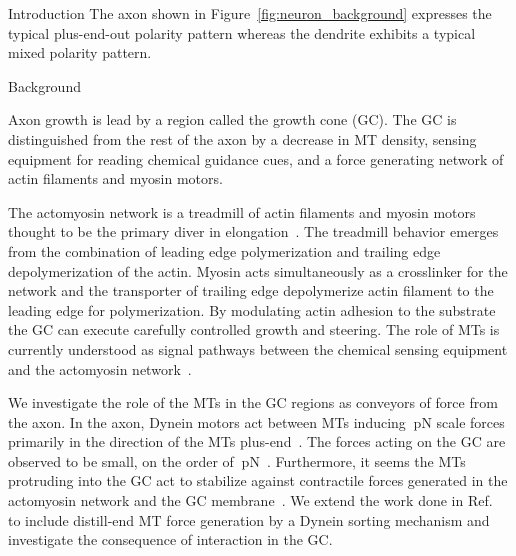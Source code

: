 \documentclass{beamer}
\newlength{\colwidth}
\begin{document}
\begin{frame}[t]
\begin{columns}[t]
\begin{column}{\colwidth}
\begin{block}{Introduction}
The axon shown in Figure~\ref{fig:neuron_background} expresses the typical plus-end-out polarity pattern whereas the dendrite exhibits a typical mixed polarity pattern.

\end{block}

\begin{block}{Background}


Axon growth is lead by a region called the growth cone (GC). The GC is distinguished from the rest of the axon by a decrease in MT density, sensing equipment for reading chemical guidance cues, and a force generating network of actin filaments and myosin motors.


The actomyosin network is a treadmill of actin filaments and myosin motors thought to be the primary diver in elongation~\cite{craig2012bj}. The treadmill behavior emerges from the combination of leading edge polymerization and trailing edge depolymerization of the actin. Myosin acts simultaneously as a crosslinker for the network and the transporter of trailing edge depolymerize actin filament to the leading edge for polymerization. By modulating actin adhesion to the substrate the GC can execute carefully controlled growth and steering. The role of MTs is currently understood as signal pathways between the chemical sensing equipment and the actomyosin network~\cite{craig2012bj, kalil2005con, sanchez-huertas2021fmn}.


We investigate the role of the MTs in the GC regions as conveyors of force from the axon. In the axon, Dynein motors act between MTs inducing \(\qty{}{\pico\newton}\) scale forces primarily in the direction of the MTs plus-end~\cite{nedelec1997n13}. The forces acting on the GC are observed to be small, on the order of \(\qty{}{\pico\newton}\)~\cite{devincentiis2020jn, raffa2023scdb}. Furthermore, it seems the MTs protruding into the GC act to stabilize against contractile forces generated in the actomyosin network and the GC membrane~\cite{raffa2023scdb}. We extend the work done in Ref.~\cite{craig2012bj} to include distill-end MT force generation by a Dynein sorting mechanism and investigate the consequence of interaction in the GC.

\end{block}


\end{column}
\end{columns}
\end{frame}
\end{document}
